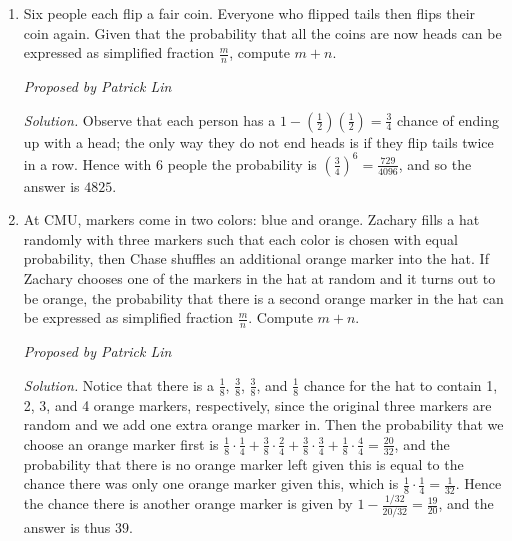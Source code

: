 \documentclass[10pt]{article}
\newcommand{\proposed}[1]
{
\vspace{5pt}
\noindent\textit{Proposed by #1}
}
\newcommand{\solution}
{
\vspace{5pt}
\noindent\textit{Solution.}\qquad
}
\newcommand{\comment}[1]{}
\begin{document}
\begin{enumerate}
\item Six people each flip a fair coin. Everyone who flipped tails then flips their coin again. Given that the probability that all the coins are now heads can be expressed as simplified fraction $\tfrac{m}{n}$, compute $m+n$.

\proposed{Patrick Lin}

\solution Observe that each person has a $1 - (\tfrac12)(\tfrac12) = \tfrac34$ chance of ending up with a head; the only way they do not end heads is if they flip tails twice in a row. Hence with 6 people the probability is $(\tfrac34)^6 = \tfrac{729}{4096}$, and so the answer is $\boxed{4825}$.

\item At CMU, markers come in two colors: blue and orange. Zachary fills a hat randomly with three markers such that each color is chosen with equal probability, then Chase shuffles an additional orange marker into the hat. If Zachary chooses one of the markers in the hat at random and it turns out to be orange, the probability that there is a second orange marker in the hat can be expressed as simplified fraction $\tfrac{m}{n}$. Compute $m+n$.

\proposed{Patrick Lin}

\solution Notice that there is a $\tfrac18$, $\tfrac38$, $\tfrac38$, and $\tfrac18$ chance for the hat to contain 1, 2, 3, and 4 orange markers, respectively, since the original three markers are random and we add one extra orange marker in. Then the probability that we choose an orange marker first is $\tfrac18 \cdot \tfrac14 + \tfrac38 \cdot \tfrac24 + \tfrac38 \cdot \tfrac34 + \tfrac18 \cdot \tfrac44 = \tfrac{20}{32}$, and the probability that there is no orange marker left given this is equal to the chance there was only one orange marker given this, which is $\tfrac18 \cdot \tfrac14 = \tfrac1{32}$. Hence the chance there is another orange marker is given by $1 - \tfrac{1/32}{20/32} = \tfrac{19}{20}$, and the answer is thus $\boxed{39}$.

\comment{
\item Kevin is located on the top face of a regular dodecahedron. Every minute, he moves randomly to an adjacent face. Determine the expected amount of time, in minutes, that will pass before he moves to the bottom face for the first time.

\proposed{Patrick Lin}

\solution Let $E_n$ represent the expected amount of time it takes Kevin to move to the bottom face, where $n$ is the minimum distance, in time steps, from the bottom. Then clearly we want to find $E_3$. By examining the geometry of a dodecahedron, we have the following recurrences:
\begin{align*}
E_0 & = 0 \\
E_1 & = 1 + \tfrac15 E_0 + \tfrac25 E_1 + \tfrac25 E_2 \\
E_2 & = 1 + \tfrac25 E_1 + \tfrac25 E_2 + \tfrac15 E_3 \\
E_3 & = 1 + E_2
\end{align*}
Solving this yields $E_3 = \boxed{15}$.}


\end{enumerate}
\end{document}
